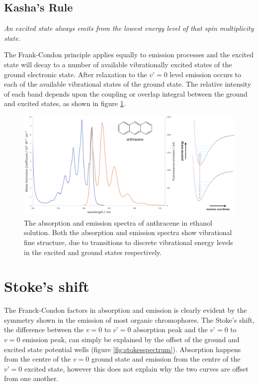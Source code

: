 \documentclass[
]{book}
\begin{document}
\hypertarget{sec:Kasha}{%
\subsection{Kasha's Rule}\label{sec:Kasha}}

\emph{An excited state always emits from the lowest energy level of that spin multiplicity state.}

The Frank-Condon principle applies equally to emission processes and the excited state will decay to a number of available vibrationally excited states of the ground electronic state. After relaxation to the \(v’ = 0\) level emission occurs to each of the available vibrational states of the ground state. The relative intensity of each band depends upon the coupling or overlap integral between the ground and excited states, as shown in figure \ref{fig:anthracenekasha}.

\begin{figure}

{\centering \includegraphics[width=0.7\linewidth]{images/anthracenekasha} 

}

\caption{The absorption and emission spectra of anthracene in ethanol solution. Both the absorption and emission spectra show vibrational fine structure, due to transitions to discrete vibrational energy levels in the excited and ground states respectively.}\label{fig:anthracenekasha}
\end{figure}

\hypertarget{sec:stoke}{%
\section{Stoke's shift}\label{sec:stoke}}

The Franck-Condon factors in absorption and emission is clearly evident by the symmetry shown in the emission of most organic chromophores. The Stoke's shift, the difference between the \(v=0\) to \(v’=0\) absorption peak and the \(v’=0\) to \(v=0\) emission peak, can simply be explained by the offset of the ground and excited state potential wells (figure \ref{fig:stokesspectrum}). Absorption happens from the centre of the \(v=0\) ground state and emission from the centre of the \(v’=0\) excited state, however this does not explain why the two curves are offset from one another.
\end{document}
